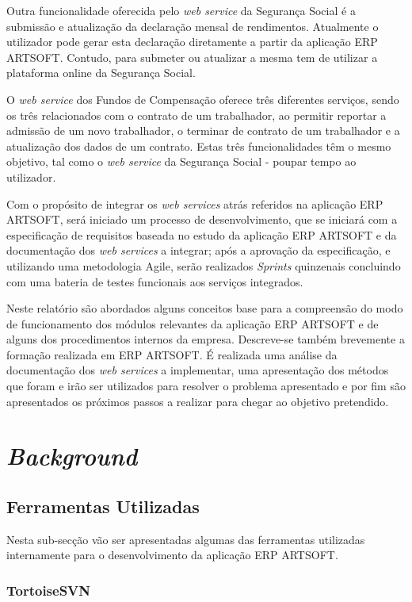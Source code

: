 \documentclass[sigplan]{acmart}
\begin{document}
Outra funcionalidade oferecida pelo \textit{web service} da Segurança Social é a submissão e atualização da declaração mensal de rendimentos. Atualmente o utilizador pode gerar esta declaração diretamente a partir da aplicação ERP ARTSOFT. Contudo, para submeter ou atualizar a mesma tem de utilizar a plataforma online da Segurança Social.

O \textit{web service} dos Fundos de Compensação oferece três diferentes serviços, sendo os três relacionados com o contrato de um trabalhador, ao permitir reportar a admissão de um novo trabalhador, o terminar de contrato de um trabalhador e a atualização dos dados de um contrato. Estas três funcionalidades têm o mesmo objetivo, tal como o \textit{web service} da Segurança Social - poupar tempo ao utilizador.

Com o propósito de integrar os \textit{web services} atrás referidos na aplicação ERP ARTSOFT, será iniciado um processo de desenvolvimento, que se iniciará com a especificação de requisitos baseada no estudo da aplicação ERP ARTSOFT e da documentação dos \textit{web services} a integrar; após a aprovação da especificação, e utilizando uma metodologia Agile, serão realizados \textit{Sprints} quinzenais concluindo com uma bateria de testes funcionais aos serviços integrados.

Neste relatório são abordados alguns conceitos base para a compreensão do modo de funcionamento dos módulos relevantes da aplicação ERP ARTSOFT e de alguns dos procedimentos internos da empresa. Descreve-se também brevemente a formação realizada em ERP ARTSOFT. É realizada uma análise da documentação dos \textit{web services} a implementar, uma apresentação dos métodos que foram e irão ser utilizados para resolver o problema apresentado e por fim são apresentados os próximos passos a realizar para chegar ao objetivo pretendido.

\section{\textit{Background}} \label{sec:background}

\subsection{Ferramentas Utilizadas}

Nesta sub-secção vão ser apresentadas algumas das ferramentas utilizadas internamente para o desenvolvimento da aplicação ERP ARTSOFT.

\subsubsection{TortoiseSVN}
\end{document}
